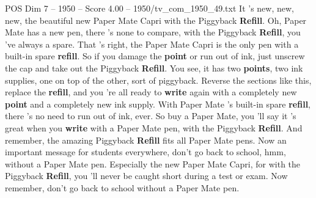 \begin{textsample}{POS Dim 7 – 1950 – Score 4.00 – 1950/tv\_com\_1950\_49.txt}  \label{ex:f7_pos_007}
It 's new, new, new, the beautiful new Paper Mate Capri with the Piggyback \textbf{Refill}.
Oh, Paper Mate has a new pen, there 's none to compare, with the Piggyback \textbf{Refill}, you 've always a spare.
That 's right, the Paper Mate Capri is the only pen with a built-in spare \textbf{refill}.
So if you damage the \textbf{point} or run out of ink, just unscrew the cap and take out the Piggyback \textbf{Refill}.
You see, it has two \textbf{points}, two ink supplies, one on top of the other, sort of piggyback.
Reverse the sections like this, replace the \textbf{refill}, and you 're all ready to \textbf{write} again with a completely new \textbf{point} and a completely new ink supply.
With Paper Mate 's built-in spare \textbf{refill}, there 's no need to run out of ink, ever.
So buy a Paper Mate, you 'll say it 's great when you \textbf{write} with a Paper Mate pen, with the Piggyback \textbf{Refill}.
And remember, the amazing Piggyback \textbf{Refill} fits all Paper Mate pens.
Now an important message for students everywhere, don't go back to school, hmm, without a Paper Mate pen.
Especially the new Paper Mate Capri, for with the Piggyback \textbf{Refill}, you 'll never be caught short during a test or exam.
Now remember, don't go back to school without a Paper Mate pen.

\end{textsample}
